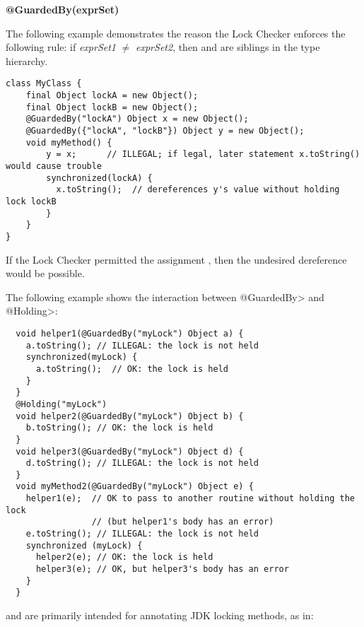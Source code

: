 

\textbf{@GuardedBy(exprSet)}

The following example demonstrates the reason the Lock Checker enforces the
following rule:  if \emph{exprSet1} $\neq$ \emph{exprSet2}, then
 and  are siblings in the type
hierarchy.

\begin{Verbatim}
class MyClass {
    final Object lockA = new Object();
    final Object lockB = new Object();
    @GuardedBy("lockA") Object x = new Object();
    @GuardedBy({"lockA", "lockB"}) Object y = new Object();
    void myMethod() {
        y = x;      // ILLEGAL; if legal, later statement x.toString() would cause trouble
        synchronized(lockA) {
          x.toString();  // dereferences y's value without holding lock lockB
        }
    }
}
\end{Verbatim}


If the Lock Checker permitted the assignment
, then the undesired dereference would be possible.



The following example shows the interaction between \<@GuardedBy> and
\<@Holding>:

\begin{Verbatim}
  void helper1(@GuardedBy("myLock") Object a) {
    a.toString(); // ILLEGAL: the lock is not held
    synchronized(myLock) {
      a.toString();  // OK: the lock is held
    }
  }
  @Holding("myLock")
  void helper2(@GuardedBy("myLock") Object b) {
    b.toString(); // OK: the lock is held
  }
  void helper3(@GuardedBy("myLock") Object d) {
    d.toString(); // ILLEGAL: the lock is not held
  }
  void myMethod2(@GuardedBy("myLock") Object e) {
    helper1(e);  // OK to pass to another routine without holding the lock
                 // (but helper1's body has an error)
    e.toString(); // ILLEGAL: the lock is not held
    synchronized (myLock) {
      helper2(e); // OK: the lock is held
      helper3(e); // OK, but helper3's body has an error
    }
  }
\end{Verbatim}



 and  are primarily intended
for annotating JDK locking methods, as in:

